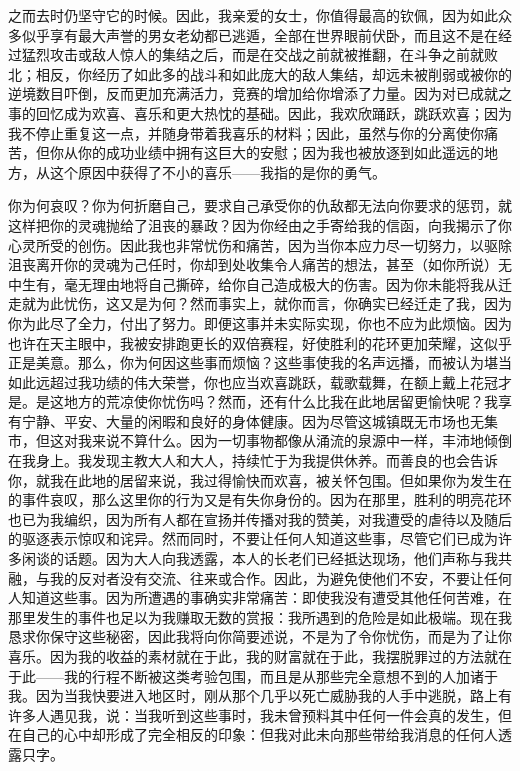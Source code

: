 之而去时仍坚守它的时候。因此，我亲爱的女士，你值得最高的钦佩，因为如此众多似乎享有最大声誉的男女老幼都已逃遁，全部在世界眼前伏卧，而且这不是在经过猛烈攻击或敌人惊人的集结之后，而是在交战之前就被推翻，在斗争之前就败北；相反，你经历了如此多的战斗和如此庞大的敌人集结，却远未被削弱或被你的逆境数目吓倒，反而更加充满活力，竞赛的增加给你增添了力量。因为对已成就之事的回忆成为欢喜、喜乐和更大热忱的基础。因此，我欢欣踊跃，跳跃欢喜；因为我不停止重复这一点，并随身带着我喜乐的材料；因此，虽然与你的分离使你痛苦，但你从你的成功业绩中拥有这巨大的安慰；因为我也被放逐到如此遥远的地方，从这个原因中获得了不小的喜乐——我指的是你的勇气。\par


你为何哀叹？你为何折磨自己，要求自己承受你的仇敌都无法向你要求的惩罚，就这样把你的灵魂抛给了沮丧的暴政？因为你经由之手寄给我的信函，向我揭示了你心灵所受的创伤。因此我也非常忧伤和痛苦，因为当你本应力尽一切努力，以驱除沮丧离开你的灵魂为己任时，你却到处收集令人痛苦的想法，甚至（如你所说）无中生有，毫无理由地将自己撕碎，给你自己造成极大的伤害。因为你未能将我从迁走就为此忧伤，这又是为何？然而事实上，就你而言，你确实已经迁走了我，因为你为此尽了全力，付出了努力。即便这事并未实际实现，你也不应为此烦恼。因为也许在天主眼中，我被安排跑更长的双倍赛程，好使胜利的花环更加荣耀，这似乎正是美意。那么，你为何因这些事而烦恼？这些事使我的名声远播，而被认为堪当如此远超过我功绩的伟大荣誉，你也应当欢喜跳跃，载歌载舞，在额上戴上花冠才是。是这地方的荒凉使你忧伤吗？然而，还有什么比我在此地居留更愉快呢？我享有宁静、平安、大量的闲暇和良好的身体健康。因为尽管这城镇既无市场也无集市，但这对我来说不算什么。因为一切事物都像从涌流的泉源中一样，丰沛地倾倒在我身上。我发现主教大人和大人，持续忙于为我提供休养。而善良的也会告诉你，就我在此地的居留来说，我过得愉快而欢喜，被关怀包围。但如果你为发生在的事件哀叹，那么这里你的行为又是有失你身份的。因为在那里，胜利的明亮花环也已为我编织，因为所有人都在宣扬并传播对我的赞美，对我遭受的虐待以及随后的驱逐表示惊叹和诧异。然而同时，不要让任何人知道这些事，尽管它们已成为许多闲谈的话题。因为大人向我透露，本人的长老们已经抵达现场，他们声称与我共融，与我的反对者没有交流、往来或合作。因此，为避免使他们不安，不要让任何人知道这些事。因为所遭遇的事确实非常痛苦：即使我没有遭受其他任何苦难，在那里发生的事件也足以为我赚取无数的赏报：我所遇到的危险是如此极端。现在我恳求你保守这些秘密，因此我将向你简要述说，不是为了令你忧伤，而是为了让你喜乐。因为我的收益的素材就在于此，我的财富就在于此，我摆脱罪过的方法就在于此——我的行程不断被这类考验包围，而且是从那些完全意想不到的人加诸于我。因为当我快要进入地区时，刚从那个几乎以死亡威胁我的人手中逃脱，路上有许多人遇见我，说：当我听到这些事时，我未曾预料其中任何一件会真的发生，但在自己的心中却形成了完全相反的印象：但我对此未向那些带给我消息的任何人透露只字。\par

